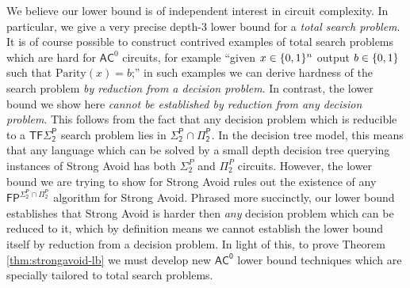 
We believe our lower bound is of independent interest in %
circuit complexity. In particular, we give a very precise depth-3 lower bound for a \emph{total search problem}. It is of course possible to construct contrived examples of total search problems which are hard for $\mathsf{AC}^0$ circuits, for example ``given $x \in \{0,1\}^n$ output $b \in \{0,1\}$ such that $\mathrm{Parity}(x)=b$;'' in such examples we can derive hardness of the search problem \emph{by reduction from a decision problem}. In contrast, the lower bound we show here \emph{cannot be established by reduction from any decision problem}. This follows from the fact that any decision problem which is reducible to a $\mathsf{TF\Sigma_2^P}$ search problem lies in $\mathsf{\Sigma_2^P \cap \Pi_2^P}$. In the decision tree model, this means that any language which can be solved by a small depth decision tree querying instances of {\sc Strong Avoid} has both $\Sigma_2^P$ and $\Pi_2^P$ circuits. However, the lower bound we are trying to show for {\sc Strong Avoid} rules out the existence of any $\mathsf{FP^{\Sigma_2^P \cap \Pi_2^P}}$ algorithm for {\sc Strong Avoid}. Phrased more succinctly, our lower bound establishes that {\sc Strong Avoid} is harder then \emph{any} decision problem which can be reduced to it, which by definition means we cannot establish the lower bound itself by reduction from a decision problem. In light of this, to prove Theorem \ref{thm:strongavoid-lb} we must develop new $\mathsf{AC^0}$ lower bound techniques which are specially tailored to total search problems.


